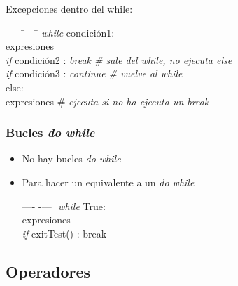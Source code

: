 		\noindent Excepciones dentro del while:

		\begin{tabbing}
	    ---- \= ---- \= \kill
		\> \textit{while} condición1:\\
		\>\> expresiones \\
		\>\textit{if} condición2 : \textit{break \# sale del while, no ejecuta else}\\
		\>\textit{if} condición3 : \textit{continue \# vuelve al while}\\
		\> else: \\
		\>\> expresiones \# \textit{ejecuta si no ha ejecuta un break} 
		\end{tabbing}

		\subsubsection{Bucles \textit{do while}}
		\begin{itemize}
		\item No hay bucles \textit{do while}
		\item Para hacer un equivalente a un \textit{do while}
		\begin{tabbing}
	    ---- \= ---- \= \kill
		\> \textit{while} True:\\
		\>\> expresiones \\
		\>\> \textit{if} exitTest() : break \\
		\end{tabbing}
		\end{itemize}

	\subsection{Operadores}

